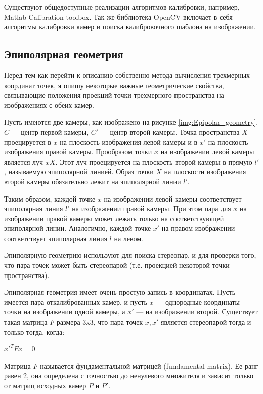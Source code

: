Существуют общедоступные реализации алгоритмов калибровки, например, Matlab Calibration toolbox. Так же библиотека OpenCV включает в себя алгоритмы калибровки камер и поиска калибровочного шаблона на изображении.

\subsection{Эпиполярная геометрия}
Перед тем как перейти к описанию собственно метода вычисления трехмерных координат точек, я опишу некоторые важные геометрические свойства, связывающие положения проекций точки трехмерного пространства на изображениях с обеих камер.


Пусть имеются две камеры, как изображено на рисунке \ref{img:Epipolar_geometry}. $C$ — центр первой камеры, $C'$ — центр второй камеры. Точка пространства $X$ проецируется в $x$ на плоскость изображения левой камеры и в $x'$ на плоскость изображения правой камеры. Прообразом точки $x$ на изображении левой камеры является луч $xX$. Этот луч проецируется на плоскость второй камеры в прямую $l'$, называемую эпиполярной линией. Образ точки $X$ на плоскости изображения второй камеры обязательно лежит на эпиполярной линии $l'$.

Таким образом, каждой точке $x$ на изображении левой камеры соответствует эпиполярная линия $l'$ на изображении правой камеры. При этом пара для $x$ на изображении правой камеры может лежать только на соответствующей эпиполярной линии. Аналогично, каждой точке $x'$ на правом изображении соответствует эпиполярная линия $l$ на левом.

Эпиполярную геометрию используют для поиска стереопар, и для проверки того, что пара точек может быть стереопарой (т.е. проекцией некоторой точки пространства).

Эпиполярная геометрия имеет очень простую запись в координатах. Пусть имеется пара откалиброванных камер, и пусть $x$ — однородные координаты точки на изображении одной камеры, а $x'$ — на изображении второй. Существует такая матрица $F$ размера 3x3, что пара точек $x, x'$ является стереопарой тогда и только тогда, когда:

$x'^T F x = 0$

Матрица $F$ называется фундаментальной матрицей (fundamental matrix). Ее ранг равен 2, она определена с точностью до ненулевого множителя и зависит только от матриц исходных камер $P$ и $P'$.

